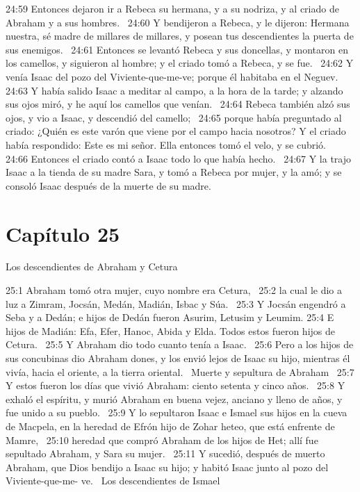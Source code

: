 24:59 Entonces dejaron ir a Rebeca su hermana, y a su nodriza, y al criado de Abraham y a sus hombres.  
24:60 Y bendijeron a Rebeca, y le dijeron: Hermana nuestra, sé madre de millares de millares, y posean tus descendientes la puerta de sus enemigos.  
24:61 Entonces se levantó Rebeca y sus doncellas, y montaron en los camellos, y siguieron al hombre; y el criado tomó a Rebeca, y se fue.  
24:62 Y venía Isaac del pozo del Viviente-que-me-ve; porque él habitaba en el Neguev.  
24:63 Y había salido Isaac a meditar al campo, a la hora de la tarde; y alzando sus ojos miró, y he aquí los camellos que venían.  
24:64 Rebeca también alzó sus ojos, y vio a Isaac, y descendió del camello;  
24:65 porque había preguntado al criado: ¿Quién es este varón que viene por el campo hacia nosotros? Y el criado había respondido: Este es mi señor. Ella entonces tomó el velo, y se cubrió.  
24:66 Entonces el criado contó a Isaac todo lo que había hecho.  
24:67 Y la trajo Isaac a la tienda de su madre Sara, y tomó a Rebeca por mujer, y la amó; y se consoló Isaac después de la muerte de su madre. 
\section*{Capítulo 25}
Los descendientes de Abraham y Cetura  


25:1 Abraham tomó otra mujer, cuyo nombre era Cetura,  
25:2 la cual le dio a luz a Zimram, Jocsán, Medán, Madián, Isbac y Súa.  
25:3 Y Jocsán engendró a Seba y a Dedán; e hijos de Dedán fueron Asurim, Letusim y Leumim. 
25:4 E hijos de Madián: Efa, Efer, Hanoc, Abida y Elda. Todos estos fueron hijos de Cetura.  
25:5 Y Abraham dio todo cuanto tenía a Isaac.  
25:6 Pero a los hijos de sus concubinas dio Abraham dones, y los envió lejos de Isaac su hijo, mientras él vivía, hacia el oriente, a la tierra oriental.  
Muerte y sepultura de Abraham  
25:7 Y estos fueron los días que vivió Abraham: ciento setenta y cinco años.  
25:8 Y exhaló el espíritu, y murió Abraham en buena vejez, anciano y lleno de años, y fue unido a su pueblo.  
25:9 Y lo sepultaron Isaac e Ismael sus hijos en la cueva de Macpela, en la heredad de Efrón hijo de Zohar heteo, que está enfrente de Mamre,  
25:10 heredad que compró Abraham de los hijos de Het; allí fue sepultado Abraham, y Sara su mujer.  
25:11 Y sucedió, después de muerto Abraham, que Dios bendijo a Isaac su hijo; y habitó Isaac junto al pozo del Viviente-que-me- ve.  
Los descendientes de Ismael  

